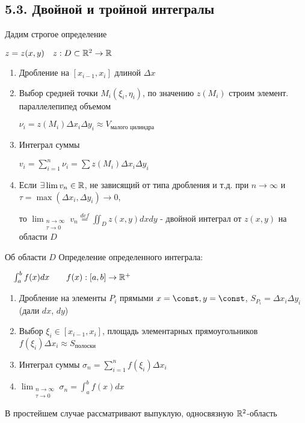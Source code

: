 \documentclass[12pt]{article}
\begin{document}
    \subsection{5.3. Двойной и тройной интегралы}

    \hypertarget{doubleintegral}{}

    \Nota Дадим строгое определение

    \begin{multicols}{2}
        \Defs $z = z(x, y) \quad z : D \subset \mathbb{R}^2 \rightarrow \mathbb{R}$
        
        \begin{enumerate}
            \item Дробление на $[x_{i-1}, x_i]$ длиной $\Delta x$

            \item Выбор средней точки $M_i(\xi_i, \eta_i)$, по значению $z(M_i)$ строим элемент. параллелепипед объемом

            $\nu_i = z(M_i) \Delta x_i \Delta y_i \approx V_{\text{малого цилиндра}}$
            
            \item Интеграл суммы

            $v_i = \sum_{i=1}^n \nu_i = \sum z(M_i) \Delta x_i \Delta y_i$
            
            \item Если $\exists \lim v_n \in \mathbb{R}$, не зависящий от типа дробления и т.д. при $n \rightarrow \infty$ и
            $\tau = \max (\Delta x_i, \Delta y_i) \to 0$,
    
            то $\lim_{\substack{n\to\infty \\ \tau \to 0}} v_n \stackrel{def}{=} \iint_D z(x, y) dx dy$ - двойной интеграл от $z(x, y)$ на области $D$
        \end{enumerate}

        \mediumvspace

    \Nota Об области $D$
        \Mems Определение определенного интеграла:
        
        $\quad \int_a^b f(x) dx \quad\quad f(x) : [a, b] \rightarrow \mathbb{R}^+$ \\
        
        \begin{enumerate}
            \item Дробление на элементы $P_i$ прямыми $x = \const, y = \const$, $S_{P_i} = \Delta x_i \Delta y_i$ (дали $dx$, $dy$)
            \item Выбор $\xi_i \in [x_{i-1}, x_i]$, площадь элементарных прямоугольников $f(\xi_i)\Delta x_i \approx S_{\text{полоски}}$
            \item Интеграл суммы $\sigma_n = \sum_{i=1}^n f(\xi_i) \Delta x_i$
            \item $\lim_{\substack{n\to\infty \\ \tau \to 0}} \sigma_n = \int^b_a f(x) dx$
        \end{enumerate}

    В простейшем случае рассматривают выпуклую, односвязную $\mathbb{R}^2$-область
    \end{multicols}
\end{document}
